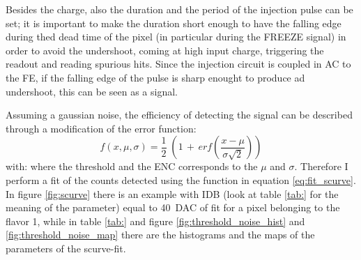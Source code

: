         Besides the charge, also the duration and the period of the injection pulse can be set; it is important to make the duration short enough to have the falling edge during thed dead time of the pixel (in particular during the FREEZE signal) in order to avoid the undershoot, coming at high input charge, triggering the readout and reading spurious hits. 
        Since the injection circuit is coupled in AC to the FE, if the falling edge of the pulse is sharp enought to produce ad undershoot, this can be seen as a signal. 

        Assuming a gaussian noise, the efficiency of detecting the signal can be described through a modification of the error function:
        \begin{equation}
            f(x, \mu, \sigma) = \frac{1}{2} \; \left(1\,+\,erf\left(\frac{x-\mu}{\sigma \sqrt{2}}\right)\right)
            \label{eq:fit_scurve}
        \end{equation}
        with: 
        where the threshold and the ENC corresponds to the $\mu$ and $\sigma$.
        Therefore I perform a fit of the counts detected using the function in equation \ref{eq:fit_scurve}. In figure \ref{fig:scurve} there is an example with IDB (look at table \ref{tab:} for the meaning of the parameter) equal to \SI{40}{DAC} of fit for a pixel belonging to the flavor 1, while in table \ref{tab:} and figure \ref{fig:threshold_noise_hist} and \ref{fig:threshold_noise_map} there are the histograms and the maps of the parameters of the scurve-fit. 

